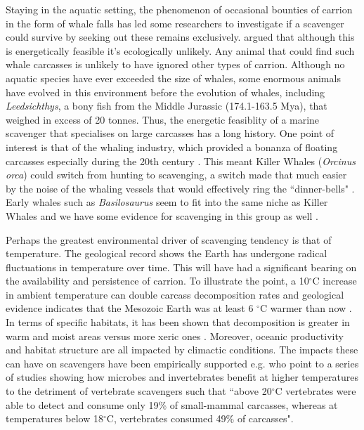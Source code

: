 \documentclass[a4paper,12pt]{article}
\begin{document}

Staying in the aquatic setting, the phenomenon of occasional bounties of carrion in the form of whale falls has led some researchers to investigate if a scavenger could survive by seeking out these remains exclusively.
\cite{ruxton2005searching} argued that although this is energetically feasible it's ecologically unlikely.
Any animal that could find such whale carcasses is unlikely to have ignored other types of carrion.
Although no aquatic species have ever exceeded the size of whales, some enormous animals have evolved in this environment before the evolution of whales, including \textit{Leedsichthys}, a bony fish from the Middle Jurassic (174.1-163.5 Mya), that weighed in excess of 20 tonnes.
Thus, the energetic feasiblity of a marine scavenger that specialises on large carcasses has a long history.
One point of interest is that of the whaling industry, which provided a bonanza of floating carcasses especially during the 20th century \citep{Whitehead415}.
This meant Killer Whales (\textit{Orcinus orca}) could switch from hunting to scavenging, a switch made that much easier by the noise of the whaling vessels that would effectively ring the ``dinner-bells" \citep{Whitehead415}.
Early whales such as \textit{Basilosaurus} seem to fit into the same niche as Killer Whales and we have some evidence for scavenging in this group as well \citep{fahlke2012bite}.

Perhaps the greatest environmental driver of scavenging tendency is that of temperature. 
The geological record shows the Earth has undergone radical fluctuations in temperature over time.
This will have had a significant bearing on the availability and persistence of carrion.
To illustrate the point, a 10$^{\circ}$C increase in ambient temperature can double carcass decomposition rates \citep{parmenter2009carrion} and geological evidence indicates that the Mesozoic Earth was at least 6 $^{\circ}$C warmer than now \citep{sellwood2006mesozoic}.
In terms of specific habitats, it has been shown that decomposition is greater in warm and moist areas versus more xeric ones \citep{beasley2015vertebrates}.
Moreover, oceanic productivity and habitat structure are all impacted by climactic conditions.
The impacts these can have on scavengers have been empirically supported e.g.
\cite{beasley2015vertebrates} who point to a series of studies showing how microbes and invertebrates benefit at higher temperatures to the detriment of vertebrate scavengers such that ``above 20$^{\circ}$C vertebrates were able to detect and consume only 19\% of small-mammal carcasses, whereas at temperatures below 18$^{\circ}$C, vertebrates consumed 49\% of carcasses".
\end{document}
